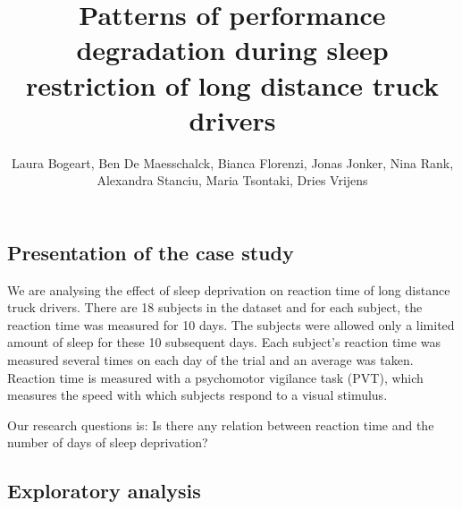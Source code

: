 \documentclass[
]{article}
\title{Patterns of performance degradation during sleep restriction of
long distance truck drivers}
\author{Laura Bogeart, Ben De Maesschalck, Bianca Florenzi, Jonas
Jonker, Nina Rank, Alexandra Stanciu, Maria Tsontaki, Dries Vrijens}
\date{}
\begin{document}
\maketitle

\hypertarget{presentation-of-the-case-study}{%
\subsection{Presentation of the case
study}\label{presentation-of-the-case-study}}

We are analysing the effect of sleep deprivation on reaction time of
long distance truck drivers. There are 18 subjects in the dataset and
for each subject, the reaction time was measured for 10 days. The
subjects were allowed only a limited amount of sleep for these 10
subsequent days. Each subject's reaction time was measured several times
on each day of the trial and an average was taken. Reaction time is
measured with a psychomotor vigilance task (PVT), which measures the
speed with which subjects respond to a visual stimulus.

Our research questions is: Is there any relation between reaction time
and the number of days of sleep deprivation?

\hypertarget{exploratory-analysis}{%
\subsection{Exploratory analysis}\label{exploratory-analysis}}
\end{document}
